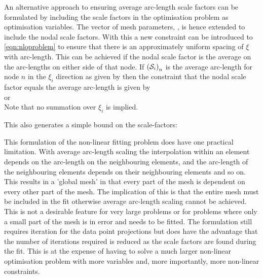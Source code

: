 An alternative approach to ensuring average arc-length scale factors can be
formulated by including the scale factors in the optimisation problem as
optimisation variables.  The vector of mesh parameters, , is hence
extended to include the nodal scale factors. With this a new constraint
can be introduced to \eqref{eqn:nloproblem} to ensure that there is an
approximately uniform spacing of $\xi$ with arc-length. This can be achieved
if the nodal scale factor is the average on the arc-lengths on either side of
that node. If $\left({\cal S}_{i}\right)_{n}$ is the average arc-length for
node $n$ in the $\xi_{i}$ direction as given by  then
the constraint that the nodal scale factor equals the average arc-length is
given by
\begin{equation}
\end{equation}
or
\begin{equation} 
  \label{eqn:arclenconst}
\end{equation}
Note that no summation over $\xi_{i}$ is implied.

This also generates a simple bound on the scale-factors:

This formulation of the non-linear fitting problem does have one practical
limitation. With average arc-length scaling the interpolation within an
element depends on the arc-length on the neighbouring elements, and the
arc-length of the neighbouring elements depends on their neighbouring elements
and so on.  This results in a 'global mesh' in that every part of the mesh
is dependent on every other part of the mesh. The implication of this is that
the entire mesh must be included in the fit otherwise average arc-length
scaling cannot be achieved. This is not a desirable feature for very large
problems or for problems where only a small part of the mesh is in error and
needs to be fitted. The formulation still requires iteration for the data
point projections but does have the advantage that the number of iterations 
required is reduced as the scale factors are found during the fit. This is 
at the expense of having to solve a much larger non-linear optimisation
problem with more variables and, more importantly, more non-linear constraints.

